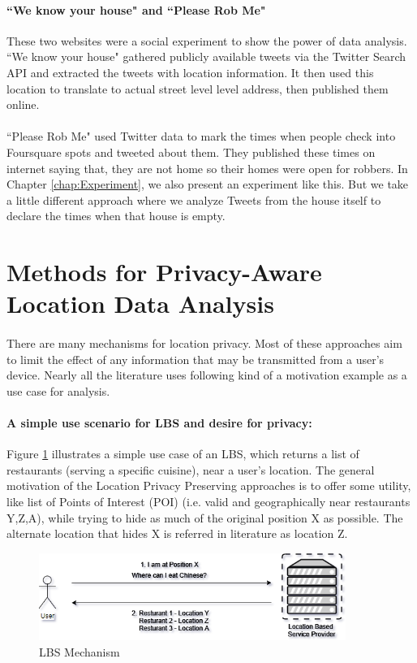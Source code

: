 \documentclass[12pt]{report}
\theoremstyle{named}
\begin{document}
\paragraph{``We know your house"\cite{WeKnowYourHouse} and ``Please Rob Me"\cite{PleaseRobMe}} These two websites were a social experiment to show the power of data analysis. ``We know your house"\cite{WeKnowYourHouse} gathered publicly available tweets via the Twitter Search API\cite{twiterSearchAPI} and extracted the tweets with location information. It then used this location to translate to actual street level level address, then published them online. 
\paragraph{}
``Please Rob Me"\cite{PleaseRobMe} used Twitter data to mark the times when people check into Foursquare\cite{Foursquare} spots and tweeted about them. They published these times on internet saying that, they are not home so their homes were open for robbers. In Chapter \ref{chap:Experiment}, we also present an experiment like this. But we take a little different approach where we analyze Tweets from the house itself to declare the times when that house is empty.

\section{Methods for Privacy-Aware Location Data Analysis}
\label{sec:MethodsForLocationPrivacy}
\paragraph{}
There are many mechanisms for location privacy. Most of these approaches aim to limit the effect of any information that may be transmitted from a user's device. Nearly all the literature uses following kind of a motivation example as a use case for analysis.
\paragraph{A simple use scenario for LBS and desire for privacy:}

Figure \ref{fig:LBSMechanism} illustrates a simple use case of an LBS, which returns a list of restaurants (serving a specific cuisine), near a user's location. The general motivation of the Location Privacy Preserving approaches is to offer some utility, like list of Points of Interest (POI) (i.e. valid and geographically near restaurants Y,Z,A), while trying to hide as much of the original position X as possible. The alternate location that hides X is referred in literature as location Z.
\begin{figure}[ht]
\centering
        \includegraphics[width=100mm,scale=0.5]{Images/LBS-Scenario.png}
    \caption{LBS Mechanism}
    \label{fig:LBSMechanism}
\end{figure}
\end{document}
